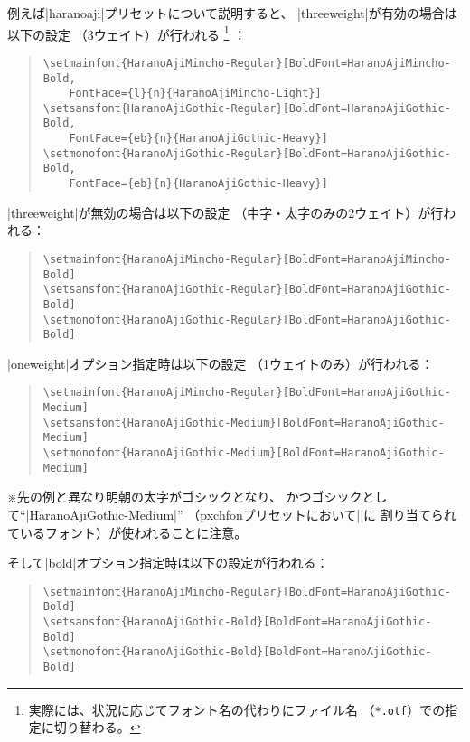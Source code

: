 \documentclass[xelatex,ja=standard,jafont=ipaex,
  a4paper]{bxjsarticle}
\newcommand{\Pkg}[1]{\textsf{#1}}
\newcommand{\Note}{\par\noindent ※}
\begin{document}
例えば\>|haranoaji|\>プリセットについて説明すると、%
|threeweight|\>が有効の場合は以下の設定
（3ウェイト）が行われる%
\footnote{実際には、状況に応じてフォント名の代わりにファイル名
（\texttt{*.otf}）での指定に切り替わる。}
：
\begin{quote}\small\begin{verbatim}
\setmainfont{HaranoAjiMincho-Regular}[BoldFont=HaranoAjiMincho-Bold,
    FontFace={l}{n}{HaranoAjiMincho-Light}]
\setsansfont{HaranoAjiGothic-Regular}[BoldFont=HaranoAjiGothic-Bold,
    FontFace={eb}{n}{HaranoAjiGothic-Heavy}]
\setmonofont{HaranoAjiGothic-Regular}[BoldFont=HaranoAjiGothic-Bold,
    FontFace={eb}{n}{HaranoAjiGothic-Heavy}]
\end{verbatim}\end{quote}

|threeweight|\>が無効の場合は以下の設定
（中字・太字のみの2ウェイト）が行われる：
\begin{quote}\small\begin{verbatim}
\setmainfont{HaranoAjiMincho-Regular}[BoldFont=HaranoAjiMincho-Bold]
\setsansfont{HaranoAjiGothic-Regular}[BoldFont=HaranoAjiGothic-Bold]
\setmonofont{HaranoAjiGothic-Regular}[BoldFont=HaranoAjiGothic-Bold]
\end{verbatim}\end{quote}

|oneweight|\>オプション指定時は以下の設定
（1ウェイトのみ）が行われる：
\begin{quote}\small\begin{verbatim}
\setmainfont{HaranoAjiMincho-Regular}[BoldFont=HaranoAjiGothic-Medium]
\setsansfont{HaranoAjiGothic-Medium}[BoldFont=HaranoAjiGothic-Medium]
\setmonofont{HaranoAjiGothic-Medium}[BoldFont=HaranoAjiGothic-Medium]
\end{verbatim}\end{quote}
\Note 先の例と異なり明朝の太字がゴシックとなり、
かつゴシックとして“|HaranoAjiGothic-Medium|”%
（\Pkg{pxchfon}プリセットにおいて\>|\setgothicfont|\>に
割り当てられているフォント）が使われることに注意。

そして\>|bold|\>オプション指定時は以下の設定が行われる：
\begin{quote}\small\begin{verbatim}
\setmainfont{HaranoAjiMincho-Regular}[BoldFont=HaranoAjiGothic-Bold]
\setsansfont{HaranoAjiGothic-Bold}[BoldFont=HaranoAjiGothic-Bold]
\setmonofont{HaranoAjiGothic-Bold}[BoldFont=HaranoAjiGothic-Bold]
\end{verbatim}\end{quote}
\end{document}
